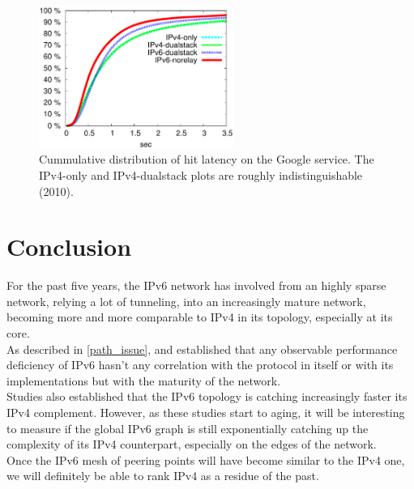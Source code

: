 \documentclass[journal]{IEEEtran}
\begin{document}
\begin{figure}[!t]
    \centering
    \includegraphics[width=2.5in]{google_latency}
    \caption{Cummulative distribution of hit latency on the Google service. The
    IPv4-only and IPv4-dualstack plots are roughly indistinguishable (2010).}
    \label{fig:google_latency}
\end{figure}

\section{Conclusion}

For the past five years, the IPv6 network has involved from an highly sparse
network, relying a lot of tunneling, into an increasingly mature network,
becoming more and more comparable to IPv4 in its topology, especially at its
core. \\
As described in \ref{path_issue}, \cite{paper3} and \cite{paper4} established 
that any observable performance deficiency of IPv6 hasn't any correlation with
the protocol in itself or with its implementations but with the maturity of the
network. \\
Studies also established that the IPv6 topology is catching increasingly faster
its IPv4 complement. However, as these studies start to aging, it will be
interesting to measure if the global IPv6 graph is still exponentially catching
up the complexity of its IPv4 counterpart, especially on the edges of the
network. \\
Once the IPv6 mesh of peering points will have become similar to the IPv4 one,
we will definitely be able to rank IPv4 as a residue of the past.

%
%
\end{document}
